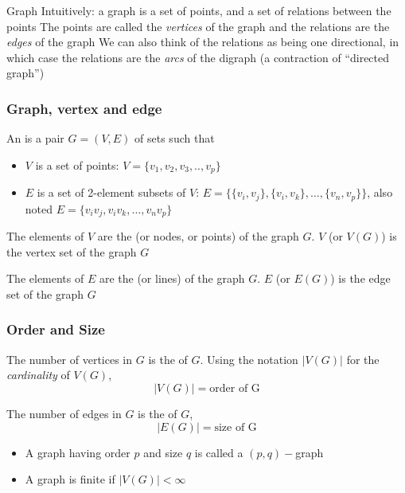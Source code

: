 \documentclass[aspectratio=43]{beamer}
\begin{document}
\begin{frame}{Graph}
	Intuitively: a graph is a set of points, and a set of relations between the points
	\vfill
	The points are called the \emph{vertices} of the graph and the relations are the \emph{edges} of the graph
	\vfill
	We can also think of the relations as being one directional, in which case the relations are the \emph{arcs} of the digraph (a contraction of ``directed graph'')
\end{frame}


\begin{frame}\frametitle{Graph, vertex and edge} 
	\begin{definition}[Graph]
	An  is a pair $G=(V,E)$ of sets such that
	\begin{itemize}
	\item $V$ is a set of points:  $V=\{v_1,v_2,v_3,..,v_p\}$
	\item $E$ is a set of 2-element subsets of $V$: $E=\{\{v_i,v_j\},\{v_i,v_k\},\dots,\{v_n,v_p\}\}$, also noted $E=\{v_iv_j,v_iv_k,\dots,v_nv_p\}$
	\end{itemize}
	\end{definition}
	\begin{definition}[Vertex]
	The elements of $V$ are the  (or nodes, or points) of the graph $G$.
	$V$ (or $V(G)$) is the vertex set of the graph $G$
	\end{definition}
	\begin{definition}[Edge]
	The elements of $E$ are the  (or lines) of the graph $G$.
	$E$ (or $E(G)$) is the edge set of the graph $G$
	\end{definition}
\end{frame}

\begin{frame}\frametitle{Order and Size}
	\begin{definition}
	The number of vertices in $G$ is the  of $G$. Using the notation $|V(G)|$ for the \emph{cardinality} of $V(G)$,
	$$|V(G)|=\textrm{order of G}$$
	\end{definition}
	\vfill
	\begin{definition}
	The number of edges in $G$ is the  of $G$,
	$$|E(G)|=\textrm{size of G}$$
	\end{definition}
	\vfill
	\begin{itemize}
	\item A graph having order $p$ and size $q$ is called a $(p,q)-$graph
	\item A graph is finite if $|V(G)|<\infty$
	\end{itemize}
\end{frame}
\end{document}
